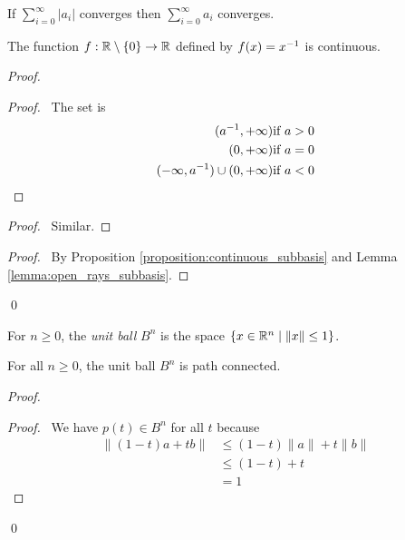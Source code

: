 \begin{corollary}
    If $\sum_{i=0}^\infty |a_i|$ converges then $\sum_{i=0}^\infty a_i$ converges.
\end{corollary}

\begin{theorem}
    The function $f : \mathbb{R} \setminus \{ 0 \} \rightarrow \mathbb{R}$ defined by $f(x) = {x}^{-1}$ is continuous.
\end{theorem}

\begin{proof}
    \pf
    \begin{proof}
        \pf\ The set is
        \begin{align*}
            ({a}^{-1}, + \infty) & \text{if } a > 0 \\
            (0, + \infty) & \text{if } a = 0 \\
            (- \infty, {a}^{-1}) \cup (0, + \infty) & \text{if } a < 0
        \end{align*}
    \end{proof}
    \begin{proof}
        \pf\ Similar.
    \end{proof}
    \qedstep
    \begin{proof}
        \pf\ By Proposition \ref{proposition:continuous_subbasis} and Lemma
        \ref{lemma:open_rays_subbasis}.
    \end{proof}
    \qed
\end{proof}


\begin{definition}
    For $n \geq 0$, the \emph{unit ball} $B^n$ is the space $\{ x \in \mathbb{R}^n \mid \| x \| \leq 1 \}$.
\end{definition}

\begin{proposition}
    For all $n \geq 0$, the unit ball $B^n$ is path connected.
\end{proposition}

\begin{proof}
    \pf
    \begin{proof}
        \pf\ We have $p(t) \in B^n$ for all $t$ because
        \begin{align*}
            \| (1-t)a + tb \| & \leq (1-t) \| a \| + t \| b \| \\
            & \leq (1-t) + t \\
            & = 1
        \end{align*}
    \end{proof}
    \qed
\end{proof}

